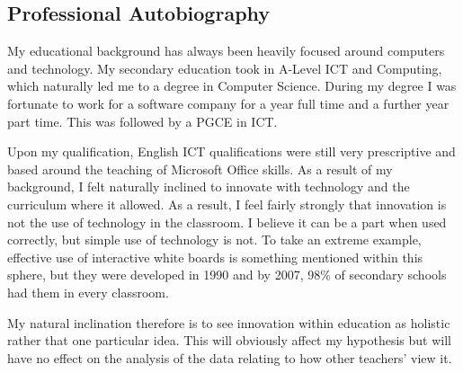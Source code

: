 \subsection{Professional Autobiography}
My educational background has always been heavily focused around computers and technology. My secondary education took in A-Level ICT and Computing, which naturally led me to a degree in Computer Science. During my degree I was fortunate to work for a software company for a year full time and a further year part time. This was followed by a PGCE in ICT.

Upon my qualification, English ICT qualifications were still very prescriptive and based around the teaching of Microsoft Office skills. As a result of my background, I felt naturally inclined to innovate with technology and the curriculum where it allowed. As a result, I feel fairly strongly that innovation is not the use of technology in the classroom. I believe it can be a part when used correctly, but simple use of technology is not. To take an extreme example, effective use of interactive white boards is something mentioned within this sphere, but they were developed in 1990 and by 2007, 98\% \cite{kitchen2008harnessing} of secondary schools had them in every classroom.

My natural inclination therefore is to see innovation within education as holistic rather that one particular idea. This will obviously affect my hypothesis but will have no effect on the analysis of the data relating to how other teachers' view it.
